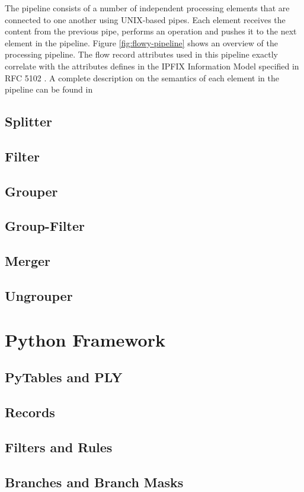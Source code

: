 The pipeline consists of a number of independent processing elements that are connected to one another using UNIX-based pipes. Each element receives the content from the previous pipe, performs an operation and pushes it to the next element in the pipeline. Figure \ref{fig:flowy-pipeline} shows an overview of the processing pipeline. The flow record attributes used in this pipeline exactly correlate with the attributes defines in the \ac{IPFIX} Information Model specified in RFC 5102 \cite{rfc5102}. A complete description on the semantics of each element in the pipeline can be found in \cite{vmarinov:thesis:2009}

  \subsection{Splitter}\label{subsec:splitter}
  \subsection{Filter}\label{subsec:filter}
  \subsection{Grouper}\label{subsec:grouper}
  \subsection{Group-Filter}\label{subsec:group-filter}
  \subsection{Merger}\label{subsec:merger}
  \subsection{Ungrouper}\label{subsec:ungrouper}

\section{Python Framework}\label{sec:python-framework}
	\subsection{PyTables and PLY}\label{subsec:pytable-ply}
	\subsection{Records}\label{subsec:records}
	\subsection{Filters and Rules}\label{subsec:filters-rules}
	\subsection{Branches and Branch Masks}\label{subsec:branches-branchmasks}
